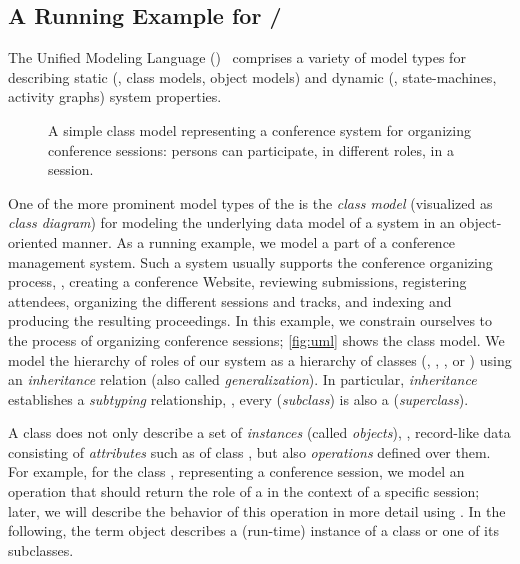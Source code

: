 \subsection{A Running Example for \UML/\OCL}
\label{sec:guidedtour}
The Unified Modeling Language
(\UML)~\cite{omg:uml-infrastructure:2011,omg:uml-superstructure:2011}
comprises a variety of model types for describing static (\eg, class
models, object models) and dynamic (\eg, state-machines, activity
graphs) system properties.
\begin{figure}
  \centering{}%
  \caption{A simple \UML class model representing a conference
    system for organizing conference sessions: persons can
    participate, in different roles, in a session. \label{fig:uml}}
\end{figure}
One of the more prominent model types of the \UML is the
\emph{class model} (visualized as \emph{class diagram}) for modeling
the underlying data model of a system in an object-oriented manner. As
a running example, we model a part of a conference management
system. Such a system usually supports the conference organizing
process, \eg, creating a conference Website, reviewing submissions,
registering attendees, organizing the different sessions and tracks,
and indexing and producing the resulting proceedings. In this example,
we constrain ourselves to the process of organizing conference
sessions; \autoref{fig:uml} shows the class model.  We model the
hierarchy of roles of our system as a hierarchy of classes (\eg,
, , or ) using
an \emph{inheritance} relation (also called \emph{generalization}). In
particular, \emph{inheritance} establishes a \emph{subtyping}
relationship, \ie, every  (\emph{subclass}) is also
a  (\emph{superclass}).

A class does not only describe a set of \emph{instances} (called
\emph{objects}), \ie, record-like data consisting of \emph{attributes}
such as  of class , but also
\emph{operations} defined over them. For example, for the class
, representing a conference session, we model an
operation  that should return the
role of a  in the context of a specific session;
later, we will describe the behavior of this operation in more detail
using \UML\@. In the following, the term object describes a
(run-time) instance of a class or one of its subclasses.

